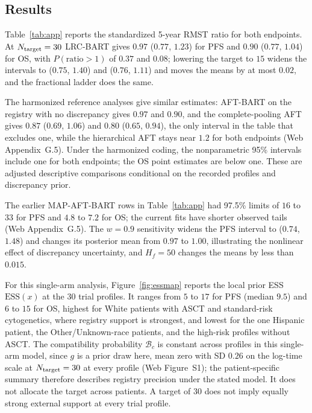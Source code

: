 \documentclass[11pt]{article}
\theoremstyle{definition}
\theoremstyle{plain}
\begin{document}
\subsection{Results}
\label{sec:app_results}

Table~\ref{tab:app} reports the standardized 5-year RMST ratio for both endpoints. At $N_{\rm target}=30$ LRC-BART gives $0.97$ ($0.77$, $1.23$) for PFS and $0.90$ ($0.77$, $1.04$) for OS, with $P(\text{ratio}>1)$ of $0.37$ and $0.08$; lowering the target to $15$ widens the intervals to ($0.75$, $1.40$) and ($0.76$, $1.11$) and moves the means by at most $0.02$, and the fractional ladder does the same.

The harmonized reference analyses give similar estimates: AFT-BART on the registry with no discrepancy gives $0.97$ and $0.90$, and the complete-pooling AFT gives $0.87$ ($0.69$, $1.06$) and $0.80$ ($0.65$, $0.94$), the only interval in the table that excludes one, while the hierarchical AFT stays near $1.2$ for both endpoints (Web Appendix~G.5). Under the harmonized coding, the nonparametric 95\% intervals include one for both endpoints; the OS point estimates are below one. These are adjusted descriptive comparisons conditional on the recorded profiles and discrepancy prior.

The earlier MAP-AFT-BART rows in Table~\ref{tab:app} had 97.5\% limits of $16$ to $33$ for PFS and $4.8$ to $7.2$ for OS; the current fits have shorter observed tails (Web Appendix~G.5). The $w=0.9$ sensitivity widens the PFS interval to ($0.74$, $1.48$) and changes its posterior mean from $0.97$ to $1.00$, illustrating the nonlinear effect of discrepancy uncertainty, and $H_f=50$ changes the means by less than $0.015$.

For this single-arm analysis, Figure~\ref{fig:essmap} reports the local prior ESS $\mathrm{ESS}(x)$ at the $30$ trial profiles. It ranges from $5$ to $17$ for PFS (median $9.5$) and $6$ to $15$ for OS, highest for White patients with ASCT and standard-risk cytogenetics, where registry support is strongest, and lowest for the one Hispanic patient, the Other/Unknown-race patients, and the high-risk profiles without ASCT. The compatibility probability $\mathcal B_c$ is constant across profiles in this single-arm model, since $g$ is a prior draw here, mean zero with SD $0.26$ on the log-time scale at $N_{\rm target}=30$ at every profile (Web Figure~S1); the patient-specific summary therefore describes registry precision under the stated model. It does not allocate the target across patients. A target of $30$ does not imply equally strong external support at every trial profile.
\end{document}
